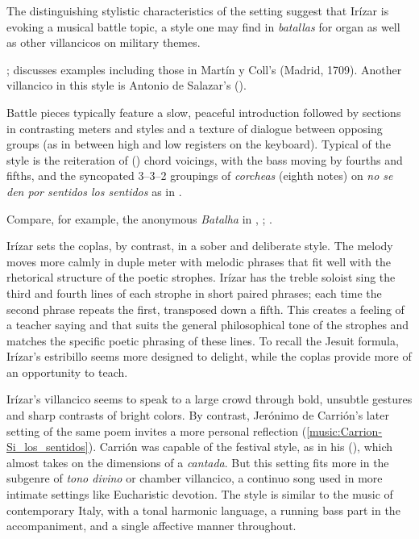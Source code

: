 The distinguishing stylistic characteristics of the setting suggest that Irízar
is evoking a musical battle topic, a style one may find in \emph{batallas} for
organ as well as other villancicos on military themes.%
\begin{Footnote}
    \Autocite[]{Grove}; 
    \autocite{Sutton:IberianBatalla} discusses examples including those in
    Martín y Coll's  (Madrid, 1709).
    Another villancico in this style is Antonio de Salazar's  ().
\end{Footnote}
Battle pieces typically feature a slow, peaceful introduction followed by
sections in contrasting meters and styles and a texture of dialogue between
opposing groups (as in between high and low registers on the keyboard).  
Typical of the style is the reiteration of  () chord voicings, with the bass moving by fourths and fifths, and the
syncopated 3--3--2 groupings of \emph{corcheas} (eighth notes) on \emph{no se
den por sentidos los sentidos} as in .%
\begin{Footnote}
    Compare, for example, the anonymous \emph{Batalha} in ,
    ; \autocite{Araujo:Batalla}.  
\end{Footnote}
Irízar sets the coplas, by contrast, in a sober and deliberate style.
The melody moves more calmly in duple meter with melodic phrases that fit well
with the rhetorical structure of the poetic strophes.  
Irízar has the treble soloist sing the third and fourth lines of each strophe in
short paired phrases; each time the second phrase repeats the first, transposed
down a fifth.
This creates a feeling of a teacher saying  and
 that suits the general philosophical tone of the
strophes and matches the specific poetic phrasing of these lines.
To recall the Jesuit formula, Irízar's estribillo seems more designed to
delight, while the coplas provide more of an opportunity to teach.

Irízar's villancico seems to speak to a large crowd through bold, unsubtle
gestures and sharp contrasts of bright colors.
By contrast, Jerónimo de Carrión's later setting of the same poem invites a more
personal reflection (\cref{music:Carrion-Si_los_sentidos}).%
    \Autocite[149--152]{Cashner:WLSCM32}
Carrión was capable of the festival style, as in his  (), which almost takes on the dimensions of a
\emph{cantada}.  
But this setting fits more in the subgenre of \emph{tono divino} or chamber
villancico, a continuo song used in more intimate settings like Eucharistic
devotion.%
    \Autocite[See, for example][]{Robledo:MadridTonos}
The style is similar to the  music of contemporary Italy,
with a tonal harmonic language, a running bass part in the accompaniment, and a
single affective manner throughout.

